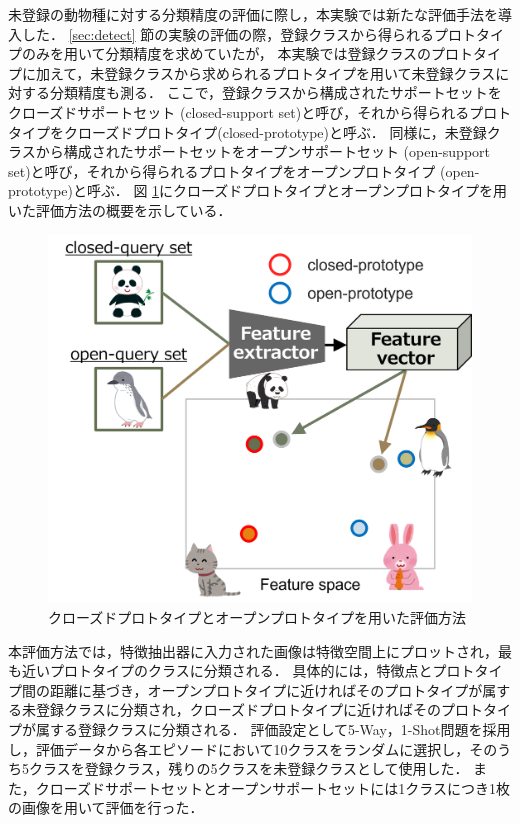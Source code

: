 \documentclass[a4paper,11pt,nomag]{jsreport}
\begin{document}
未登録の動物種に対する分類精度の評価に際し，本実験では新たな評価手法を導入した．
\ref{sec:detect} 節の実験の評価の際，登録クラスから得られるプロトタイプのみを用いて分類精度を求めていたが，
本実験では登録クラスのプロトタイプに加えて，未登録クラスから求められるプロトタイプを用いて未登録クラスに対する分類精度も測る．
ここで，登録クラスから構成されたサポートセットをクローズドサポートセット (closed-support set)と呼び，それから得られるプロトタイプをクローズドプロトタイプ(closed-prototype)と呼ぶ．
同様に，未登録クラスから構成されたサポートセットをオープンサポートセット (open-support set)と呼び，それから得られるプロトタイプをオープンプロトタイプ (open-prototype)と呼ぶ．
図 \ref{fig:openprototype}にクローズドプロトタイプとオープンプロトタイプを用いた評価方法の概要を示している．
% 
\begin{figure}[tbp]
  \centering
  \includegraphics[width=0.8\linewidth, keepaspectratio]{image/open-prototype.png}
  \caption{クローズドプロトタイプとオープンプロトタイプを用いた評価方法}
  \label{fig:openprototype}
\end{figure}
% 
本評価方法では，特徴抽出器に入力された画像は特徴空間上にプロットされ，最も近いプロトタイプのクラスに分類される．
具体的には，特徴点とプロトタイプ間の距離に基づき，オープンプロトタイプに近ければそのプロトタイプが属する未登録クラスに分類され，クローズドプロトタイプに近ければそのプロトタイプが属する登録クラスに分類される．
評価設定として5-Way，1-Shot問題を採用し，評価データから各エピソードにおいて10クラスをランダムに選択し，そのうち5クラスを登録クラス，残りの5クラスを未登録クラスとして使用した．
また，クローズドサポートセットとオープンサポートセットには1クラスにつき1枚の画像を用いて評価を行った．
\end{document}
